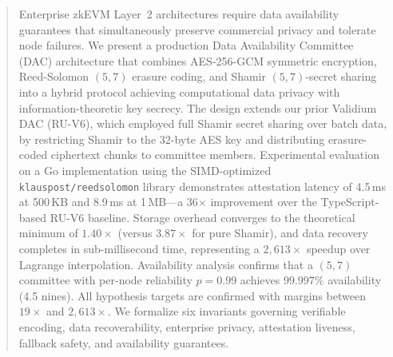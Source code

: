 
\begin{abstract}
Enterprise zkEVM Layer~2 architectures require data availability guarantees
that simultaneously preserve commercial privacy and tolerate node failures.
We present a production Data Availability Committee (DAC) architecture that
combines AES-256-GCM symmetric encryption, Reed-Solomon $(5,7)$ erasure
coding, and Shamir $(5,7)$-secret sharing into a hybrid protocol achieving
computational data privacy with information-theoretic key secrecy. The
design extends our prior Validium DAC (RU-V6), which employed full Shamir
secret sharing over batch data, by restricting Shamir to the 32-byte AES
key and distributing erasure-coded ciphertext chunks to committee members.
Experimental evaluation on a Go implementation using the SIMD-optimized
\texttt{klauspost/reedsolomon} library demonstrates attestation latency of
4.5\,ms at 500\,KB and 8.9\,ms at 1\,MB---a 36$\times$ improvement over
the TypeScript-based RU-V6 baseline. Storage overhead converges to the
theoretical minimum of $1.40\times$ (versus $3.87\times$ for pure Shamir),
and data recovery completes in sub-millisecond time, representing a
$2{,}613\times$ speedup over Lagrange interpolation. Availability analysis
confirms that a $(5,7)$ committee with per-node reliability $p = 0.99$
achieves $99.997\%$ availability (4.5 nines). All hypothesis targets are
confirmed with margins between $19\times$ and $2{,}613\times$. We formalize
six invariants governing verifiable encoding, data recoverability, enterprise
privacy, attestation liveness, fallback safety, and availability guarantees.
\end{abstract}
